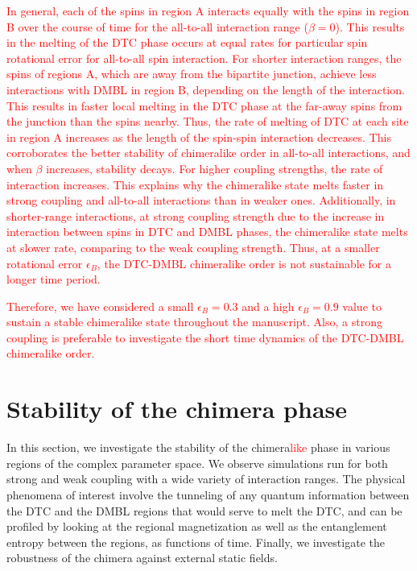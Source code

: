 \documentclass[12pt]{iopart}
\newcommand{\red}[1]{\textcolor{red}{#1}}
\begin{document}
\red{ In general, each of the spins in region A interacts equally with the spins in region B over the course of time for the all-to-all interaction range ($\beta=0$). This results in the melting of the DTC phase occurs at equal rates for particular spin rotational error for all-to-all spin interaction. For shorter interaction ranges, the spins of regions A, which are away from the bipartite junction, achieve less interactions with DMBL in region B, depending on the length of the interaction. This results in faster local melting in the DTC phase at the far-away spins from the junction than the spins nearby. Thus, the rate of melting of DTC at each site in region A increases as the length of the spin-spin interaction decreases. This corroborates the better stability of chimeralike order in all-to-all interactions, and when $\beta$ increases, stability decays. For higher coupling strengths, the rate of interaction increases. This explains why the chimeralike state melts faster in strong coupling and all-to-all interactions than in weaker ones. Additionally, in shorter-range interactions, at strong coupling strength due to the increase in interaction between spins in DTC and DMBL phases, the chimeralike state melts at slower rate, comparing to the weak coupling strength. Thus, at a smaller rotational error $\epsilon_B$, the DTC-DMBL chimeralike order is not sustainable for a longer time period.}

\red{ Therefore, we have considered a small $\epsilon_B = 0.3$ and a high $\epsilon_B = 0.9$ value to sustain a stable chimeralike state throughout the manuscript. Also, a strong coupling is preferable to investigate the short time dynamics of the DTC-DMBL chimeralike order.}

\section{\label{sec:level4} Stability of the chimera phase}
In this section, we investigate the stability of the chimera\red{like} phase in various regions of the complex parameter space. We observe simulations run for both strong and weak coupling with a wide variety of interaction ranges. The physical phenomena of interest involve the tunneling of any quantum information between the DTC and the DMBL regions that would serve to melt the DTC, and can be profiled by looking at the regional magnetization as well as the entanglement entropy between the regions, as functions of time. Finally, we investigate the robustness of the chimera against external static fields.
\end{document}

